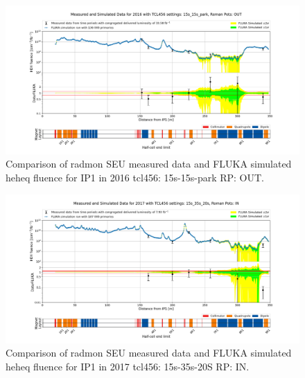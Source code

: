 \documentclass[encoding=utf8,british]{tumphthesis}
\begin{document}
\begin{figure}[H]
    \centering
    \includegraphics[width=0.90\linewidth]{results/IR1_2016_floor_level_0_350.png}
    \caption{Comparison of \acrshort{radmon} SEU measured data and FLUKA simulated \acrshort{heheq} fluence for IP1 in 2016 \acrshort{tcl}456: 15s-15s-park RP: OUT.}
    \label{fig:benchmark-radmon-heheq-ip1-2016}
\end{figure}



\begin{figure}[H]
    \centering
    \includegraphics[width=0.90\linewidth]{results/IR1_2017_floor_level_0_350.png}
    \caption{Comparison of \acrshort{radmon} SEU measured data and FLUKA simulated \acrshort{heheq} fluence for IP1 in 2017 \acrshort{tcl}456: 15s-35s-20S RP: IN.}
    \label{fig:benchmark-radmon-heheq-ip1-2017}
\end{figure}
\end{document}

